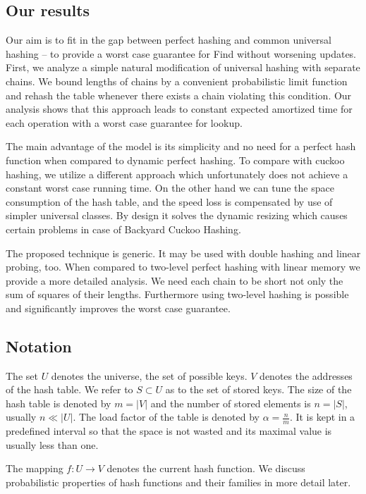 \subsection{Our results}
Our aim is to fit in the gap between perfect hashing and common universal hashing -- to provide a worst case guarantee for Find without worsening updates.
First, we analyze a simple natural modification of universal hashing with separate chains.
We bound lengths of chains by a convenient probabilistic limit function and rehash the table whenever there exists a chain violating this condition.
Our analysis shows that this approach leads to constant expected amortized time for each operation with a worst case guarantee for lookup.

The main advantage of the model is its simplicity and no need for a perfect hash function when compared to dynamic perfect hashing.
To compare with cuckoo hashing, we utilize a different approach which unfortunately does not achieve a constant worst case running time.
On the other hand we can tune the space consumption of the hash table, and the speed loss is compensated by use of simpler universal classes.
By design it solves the dynamic resizing which causes certain problems in case of Backyard Cuckoo Hashing.

The proposed technique is generic. It may be used with double hashing and linear probing, too. 
When compared to two-level perfect hashing with linear memory we provide a more detailed analysis. 
We need each chain to be short not only the sum of squares of their lengths.
Furthermore using two-level hashing is possible and significantly improves the worst case guarantee.

\subsection{Notation}
The set $U$ denotes the universe, the set of possible keys. $V$ denotes the addresses of the hash table. We refer to $S \subset U$ as to the set of stored keys. The size of the hash table is denoted by $m = |V|$ and the number of stored elements is $n = |S|$, usually $n \ll |U|$. The load factor of the table is denoted by $\alpha = \frac{n}{m}$. It is kept in a predefined interval so that the space is not wasted and its maximal value is usually less than one.

The mapping $f\colon U \rightarrow V$ denotes the current hash function. We discuss probabilistic properties of hash functions and their families in more detail later.

